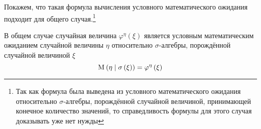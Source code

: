 Покажем, что такая формула вычисления условного математического ожидания
подходит для общего случая.\footnote{Так как формула была выведена из
условного математического ожидания относительно $\sigma$-алгебры,
порождённой случайной величиной, принимающей конечное количество значений,
то справедливость формулы для этого случая доказывать уже нет нужды}

\begin{lemma}
    В общем случае случайная величина $\varphi^{\eta}\left( \xi \right)$
    является условным математическим ожиданием случайной величины $\eta$
    относительно $\sigma$-алгебры, порождённой случайной величиной $\xi$
    $$\mathrm{M}_{} \left( \eta \mid \sigma\left( \xi \right) \right)
        = \varphi^{\eta}\left( \xi \right)$$
\end{lemma}
